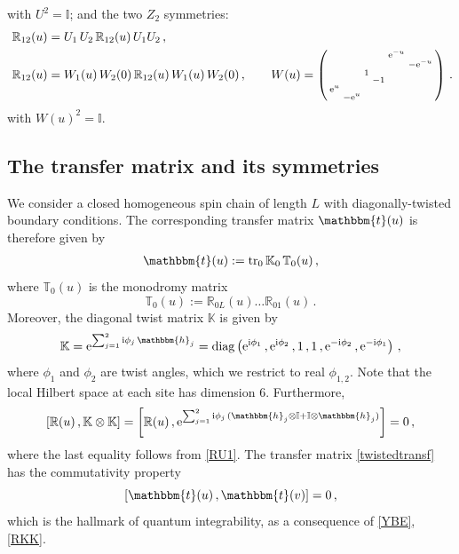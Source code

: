 \documentclass[12pt]{article}
\numberwithin{equation}{section}
\newcommand{\ri}{{\rm i}}
\newcommand{\re}{{\rm e}}
\newcommand{\id}{\mathbb{I}}
\begin{document}
with $U^2 = \id$;
and the two $Z_2$ symmetries:
\begin{align}
    \mathbb{R}_{12}(u) &= U_1\,  U_2\, \mathbb{R}_{12}(u)\, U_1 U_2\,, 
    \label{Usymmetry}\\\
    \mathbb{R}_{12}(u) &= W_1(u)\, W_2(0)\,  \mathbb{R}_{12}(u)\, W_1(u)\, W_2(0)\,, \qquad W(u)= \left(\begin{smallmatrix}
     &  &  &   & \re^{-u} & \\
     &  &  &   &    & -\re^{-u}\\
     &  & 1 &   &    & \\
     &  &  & -1 &    & \\
    \re^{u}&  &  &  &  &   \\
     & -\re^{u} &  &  &  &  
    \end{smallmatrix}\right) \,.
\label{RWsymmetry}
\end{align}
with $W(u)^2 = \id$.


\subsection{The transfer matrix and its symmetries}

We consider a closed homogeneous spin chain of length $L$
with diagonally-twisted boundary conditions.
The corresponding transfer matrix $\mathbbm{t}(u)$ is therefore given by \cite{Vega84, Skly87}
\begin{align}
    \mathbbm{t}(u):=\mathrm{tr}_{0}\, \mathbb{K}_0\, \mathbb{T}_0(u)\,,
    \label{twistedtransf}
\end{align}
where $\mathbb{T}_{0}(u)$ is the monodromy matrix
\begin{equation}
    \mathbb{T}_{0}(u):=\mathbb{R}_{0L}(u)\dots \mathbb{R}_{01}(u)\,.
    \label{monodromy}
\end{equation}
Moreover, the diagonal twist matrix $\mathbb{K}$ is given by
\begin{equation}
    \mathbb{K} = \re^{\sum_{j=1}^2 \ri \phi_j\, \mathbbm{h}_j}
    = \text{diag}\left(\re^{\ri \phi_1}\,, \re^{\ri \phi_2}\,,1\,,1\,, \re^{-\ri \phi_2}\,, \re^{-\ri \phi_1}\right)\,,
    \label{twistmatrix}
\end{equation}
where $\phi_1$ and $\phi_2$ are twist angles, which we restrict to real $\phi_{1,2}$.
Note that the local Hilbert space at each site
has dimension 6. Furthermore,
\begin{equation}
    \left[ \mathbb{R}(u) \,, \mathbb{K} \otimes \mathbb{K} \right] =  \left[ \mathbb{R}(u) \,,  \re^{\sum_{j=1}^2 \ri \phi_j\, (\mathbbm{h}_j \otimes \id + \id \otimes \mathbbm{h}_j)}\right] = 0 \,,
    \label{RKK}
\end{equation}
where the last equality follows from \eqref{RU1}.
The transfer matrix \eqref{twistedtransf} has the commutativity property
\begin{equation}
    \left[ \mathbbm{t}(u) \,, \mathbbm{t}(v) \right] = 0 \,,\label{TT}
\end{equation}
which is the hallmark of quantum integrability,
as a consequence of \eqref{YBE}, \eqref{RKK}. 
\end{document}
